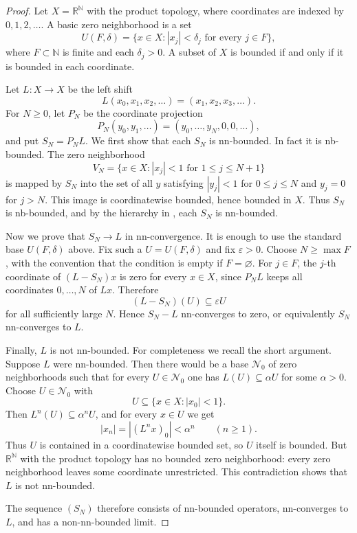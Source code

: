\documentclass[11pt]{article}
\newcommand{\NN}{\mathbb N}
\newcommand{\RR}{\mathbb R}
\begin{document}
\begin{proof}
Let \(X=\RR^\NN\) with the product topology, where coordinates are
indexed by \(0,1,2,\ldots\). A basic zero neighborhood is a set
\[
  U(F,\delta)=\{x\in X: |x_j|<\delta_j \text{ for every } j\in F\},
\]
where \(F\subset\NN\) is finite and each \(\delta_j>0\). A subset of
\(X\) is bounded if and only if it is bounded in each coordinate.

Let \(L:X\to X\) be the left shift
\[
  L(x_0,x_1,x_2,\ldots)=(x_1,x_2,x_3,\ldots).
\]
For \(N\ge 0\), let \(P_N\) be the coordinate projection
\[
  P_N(y_0,y_1,\ldots)=(y_0,\ldots,y_N,0,0,\ldots),
\]
and put \(S_N=P_NL\). We first show that each \(S_N\) is nn-bounded. In
fact it is nb-bounded. The zero neighborhood
\[
  V_N=\{x\in X: |x_j|<1\text{ for }1\le j\le N+1\}
\]
is mapped by \(S_N\) into the set of all \(y\) satisfying
\(|y_j|<1\) for \(0\le j\le N\) and \(y_j=0\) for \(j>N\). This image is
coordinatewise bounded, hence bounded in \(X\). Thus \(S_N\) is
nb-bounded, and by the hierarchy in \cite[Proposition 2.1]{Troitsky},
each \(S_N\) is nn-bounded.

Now we prove that \(S_N\to L\) in nn-convergence. It is enough to use the
standard base \(U(F,\delta)\) above. Fix such a \(U=U(F,\delta)\) and
fix \(\varepsilon>0\). Choose \(N\ge \max F\), with the convention that
the condition is empty if \(F=\varnothing\). For \(j\in F\), the
\(j\)-th coordinate of \((L-S_N)x\) is zero for every \(x\in X\), since
\(P_NL\) keeps all coordinates \(0,\ldots,N\) of \(Lx\). Therefore
\[
  (L-S_N)(U)\subseteq \varepsilon U
\]
for all sufficiently large \(N\). Hence \(S_N-L\) nn-converges to zero,
or equivalently \(S_N\) nn-converges to \(L\).

Finally, \(L\) is not nn-bounded. For completeness we recall the short
argument. Suppose \(L\) were nn-bounded. Then there would be a base
\(\mathcal N_0\) of zero neighborhoods such that for every
\(U\in\mathcal N_0\) one has \(L(U)\subseteq \alpha U\) for some
\(\alpha>0\). Choose \(U\in\mathcal N_0\) with
\[
  U\subseteq \{x\in X: |x_0|<1\}.
\]
Then \(L^n(U)\subseteq \alpha^n U\), and for every \(x\in U\) we get
\[
  |x_n|=|(L^n x)_0|<\alpha^n\qquad(n\ge 1).
\]
Thus \(U\) is contained in a coordinatewise bounded set, so \(U\) itself
is bounded. But \(\RR^\NN\) with the product topology has no bounded
zero neighborhood: every zero neighborhood leaves some coordinate
unrestricted. This contradiction shows that \(L\) is not nn-bounded.

The sequence \((S_N)\) therefore consists of nn-bounded operators,
nn-converges to \(L\), and has a non-nn-bounded limit.
\end{proof}
\end{document}
